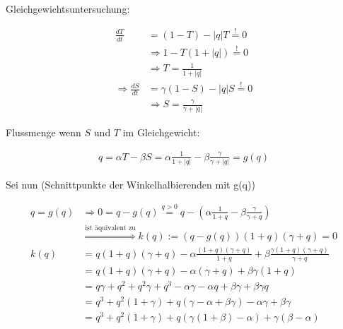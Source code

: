 \documentclass[a4paper,twoside]{article}
\begin{document}
	\noindent Gleichgewichtsuntersuchung:
	\begin{footnotesize}
	\begin{align*}
		\frac{dT}{dt} &= \left(1 - T\right) - \left|q\right|T \stackrel{!}{=} 0 \\
		&\Rightarrow 1 - T\left(1 + |q|\right) \stackrel{!}{=} 0 \\
		&\Rightarrow T = \frac{1}{1+|q|} \\
		\Rightarrow \frac{dS}{dt} &= \gamma \left(1 - S\right) - \left|q\right|S \stackrel{!}{=} 0 \\
		&\Rightarrow S = \frac{\gamma}{\gamma + |q|}
	\end{align*}
	\end{footnotesize}
	Flussmenge wenn \(S\) und \(T\) im Gleichgewicht:
	\begin{footnotesize}
	\begin{align*}
		q = \alpha T - \beta S
		 = \alpha \frac{1}{1+|q|} - \beta \frac{\gamma}{\gamma + |q|} = g(q)
	\end{align*}
	\end{footnotesize}
	Sei nun (Schnittpunkte der Winkelhalbierenden mit g(q))
	\begin{footnotesize}
	\begin{align*}
		q = g(q) &\Rightarrow 0 = q - g(q) \stackrel{q > 0}{=}  q - \left(\alpha \frac{1}{1+q} - \beta \frac{\gamma}{\gamma + q} \right) \\
		& \stackrel{\textrm{ist äquivalent zu}}{\Rightarrow}
		k(q) := \left( q - g(q) \right) (1+q) (\gamma + q) = 0 \\
		k(q) &= q(1+q) (\gamma + q) - \alpha \frac{(1+q) (\gamma + q)}{1+q} + \beta \frac{\gamma (1+q) (\gamma + q)}{\gamma + q} \\
		&= q(1+q) (\gamma + q) - \alpha (\gamma + q) + \beta \gamma (1+q) \\
		&= q \gamma + q^2 + q^2 \gamma + q^3 - \alpha \gamma - \alpha q + \beta \gamma + \beta \gamma q \\
		&= q^3 + q^2(1 + \gamma) + q(\gamma - \alpha + \beta \gamma) - \alpha \gamma + \beta \gamma \\
		&= q^3 + q^2(1 + \gamma) + q\left(\gamma \left(1 + \beta\right) - \alpha \right) + \gamma \left( \beta - \alpha \right)
	\end{align*}
	\end{footnotesize}
	
\end{document}
